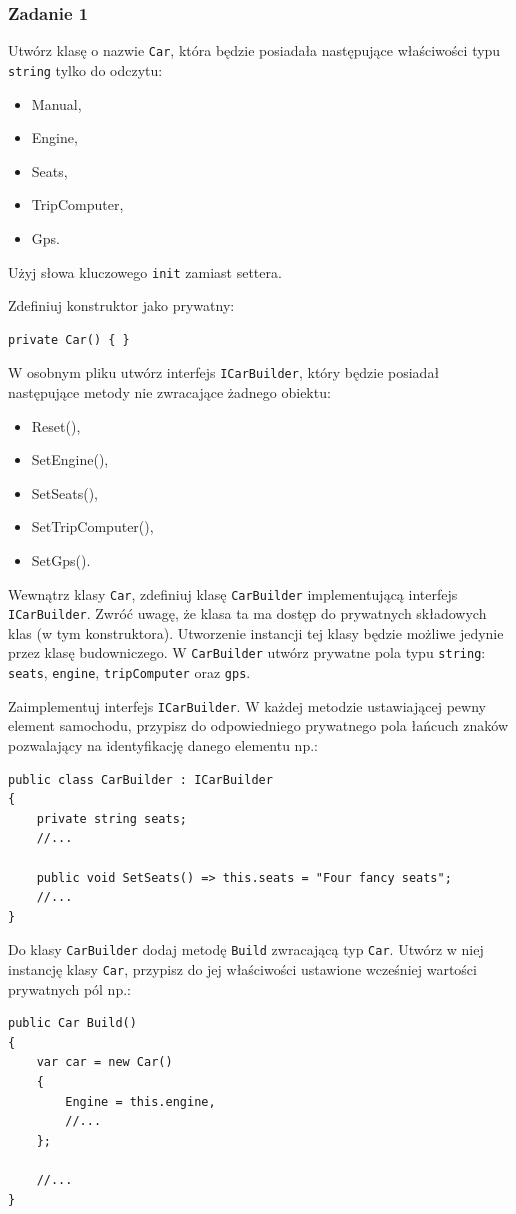 \subsubsection{Zadanie 1}
Utwórz klasę o nazwie \texttt{Car}, która będzie posiadała następujące właściwości typu \texttt{string} tylko do odczytu:
\begin{itemize}
	\item Manual,
	\item Engine,
	\item Seats,
	\item TripComputer,
	\item Gps.
\end{itemize}
Użyj słowa kluczowego \texttt{init} zamiast settera.

Zdefiniuj konstruktor jako prywatny:
\begin{lstlisting}
private Car() { }
\end{lstlisting}

W osobnym pliku utwórz interfejs \texttt{ICarBuilder}, który będzie posiadał następujące metody nie zwracające żadnego obiektu:
\begin{itemize}
	\item Reset(),
	\item SetEngine(),
	\item SetSeats(),
	\item SetTripComputer(),
	\item SetGps().
\end{itemize}

Wewnątrz klasy \texttt{Car}, zdefiniuj klasę \texttt{CarBuilder} implementującą interfejs \texttt{ICarBuilder}. Zwróć uwagę, że klasa ta ma dostęp do prywatnych składowych klas (w tym konstruktora). Utworzenie instancji tej klasy będzie możliwe jedynie przez klasę budowniczego. W \texttt{CarBuilder} utwórz prywatne pola typu \texttt{string}: \texttt{seats}, \texttt{engine}, \texttt{tripComputer} oraz \texttt{gps}.

Zaimplementuj interfejs \texttt{ICarBuilder}. W każdej metodzie ustawiającej pewny element samochodu, przypisz do odpowiedniego prywatnego pola łańcuch znaków pozwalający na identyfikację danego elementu np.:
\begin{lstlisting}
public class CarBuilder : ICarBuilder
{
	private string seats;
	//...
	
	public void SetSeats() => this.seats = "Four fancy seats";
	//...		
}
\end{lstlisting}

Do klasy \texttt{CarBuilder} dodaj metodę \texttt{Build} zwracającą typ \texttt{Car}. Utwórz w niej instancję klasy \texttt{Car}, przypisz do jej właściwości ustawione wcześniej wartości prywatnych pól np.:
\begin{lstlisting}
public Car Build()
{
	var car = new Car()
	{
		Engine = this.engine,
		//...
	};
	
	//...
}
\end{lstlisting}

